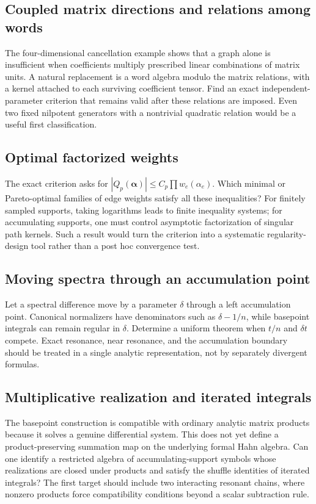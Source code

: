 \documentclass[11pt,a4paper]{article}
\numberwithin{equation}{section}
\theoremstyle{definition}
\theoremstyle{remark}
\begin{document}
\subsection{Coupled matrix directions and relations among words}
The four-dimensional cancellation example shows that a graph alone is
insufficient when coefficients multiply prescribed linear combinations of
matrix units. A natural replacement is a word algebra modulo the matrix
relations, with a kernel attached to each surviving coefficient tensor.
Find an exact independent-parameter criterion that remains valid after
these relations are imposed. Even two fixed nilpotent generators with a
nontrivial quadratic relation would be a useful first classification.

\subsection{Optimal factorized weights}
The exact criterion asks for
$|Q_p(\boldsymbol\alpha)|\leq C_p\prod w_e(\alpha_e)$.
Which minimal or Pareto-optimal families of edge weights satisfy all these
inequalities? For finitely sampled supports, taking logarithms leads to
finite inequality systems; for accumulating supports, one must control
asymptotic factorization of singular path kernels. Such a result would turn
the criterion into a systematic regularity-design tool rather than a
post hoc convergence test.

\subsection{Moving spectra through an accumulation point}
Let a spectral difference move by a parameter $\delta$ through a left
accumulation point. Canonical normalizers have denominators such as
$\delta-1/n$, while basepoint integrals can remain regular in $\delta$.
Determine a uniform theorem when $t/n$ and $\delta t$ compete. Exact
resonance, near resonance, and the accumulation boundary should be treated
in a single analytic representation, not by separately divergent formulas.

\subsection{Multiplicative realization and iterated integrals}
The basepoint construction is compatible with ordinary analytic matrix
products because it solves a genuine differential system. This does not
yet define a product-preserving summation map on the underlying formal
Hahn algebra. Can one identify a restricted algebra of accumulating-support
symbols whose realizations are closed under products and satisfy the
shuffle identities of iterated integrals? The first target should include
two interacting resonant chains, where nonzero products force compatibility
conditions beyond a scalar subtraction rule.
\end{document}
